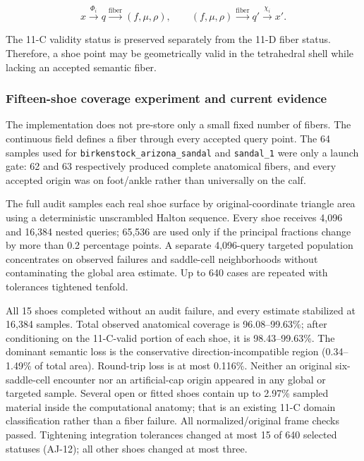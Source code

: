 \documentclass[11pt]{article}
\begin{document}
\begin{equation}
  x\xrightarrow{\Phi_i}q
  \xrightarrow{\text{fiber}}(f,\mu,\rho),
  \qquad
  (f,\mu,\rho)\xrightarrow{\text{fiber}}q'
  \xrightarrow{\chi_i}x'.
  \label{eq:instance-semantic-composition}
\end{equation}

The 11-C validity status is preserved separately from the 11-D fiber status. Therefore,
a shoe point may be geometrically valid in the tetrahedral shell while lacking an
accepted semantic fiber.

\subsubsection{Fifteen-shoe coverage experiment and current evidence}

The implementation does not pre-store only a small fixed number of fibers. The continuous
field defines a fiber through every accepted query point. The 64 samples used for
\texttt{birkenstock\_arizona\_sandal} and \texttt{sandal\_1} were only a launch gate:
62 and 63 respectively produced complete anatomical fibers, and every accepted origin
was on foot/ankle rather than universally on the calf.

The full audit samples each real shoe surface by original-coordinate triangle area using
a deterministic unscrambled Halton sequence. Every shoe receives 4,096 and 16,384 nested
queries; 65,536 are used only if the principal fractions change by more than 0.2
percentage points. A separate 4,096-query targeted population concentrates on observed
failures and saddle-cell neighborhoods without contaminating the global area estimate.
Up to 640 cases are repeated with tolerances tightened tenfold.

All 15 shoes completed without an audit failure, and every estimate stabilized at 16,384
samples. Total observed anatomical coverage is 96.08--99.63\%; after conditioning on the
11-C-valid portion of each shoe, it is 98.43--99.63\%. The dominant semantic loss is the
conservative direction-incompatible region (0.34--1.49\% of total area). Round-trip loss
is at most 0.116\%. Neither an original six-saddle-cell encounter nor an artificial-cap
origin appeared in any global or targeted sample. Several open or fitted shoes contain
up to 2.97\% sampled material inside the computational anatomy; that is an existing 11-C
domain classification rather than a fiber failure. All normalized/original frame checks
passed. Tightening integration tolerances changed at most 15 of 640 selected statuses
(AJ-12); all other shoes changed at most three.
\end{document}
